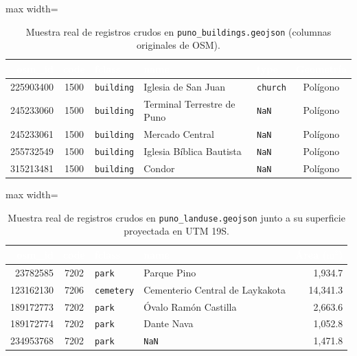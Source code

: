 \documentclass[11pt,a4paper]{article}
\begin{document}
\begin{table}[H]
    \centering
    \caption{Muestra real de registros crudos en \texttt{puno\_buildings.geojson} (columnas originales de OSM).}
    \label{tab:crudo_buildings}
    \footnotesize
    \begin{adjustbox}{max width=\textwidth}
    \begin{tabular}{rclllc}
        \toprule
        \rowcolor{verdeHeader}
        \textcolor{white}{\textbf{osm\_id}} & \textcolor{white}{\textbf{code}} & \textcolor{white}{\textbf{fclass}} & \textcolor{white}{\textbf{name}} & \textcolor{white}{\textbf{type}} & \textcolor{white}{\textbf{Geometría}} \\
        \midrule
        225903400 & 1500 & \texttt{building} & Iglesia de San Juan & \texttt{church} & Polígono \\
        \rowcolor{verdeSuave!50}
        245233060 & 1500 & \texttt{building} & Terminal Terrestre de Puno & \texttt{NaN} & Polígono \\
        245233061 & 1500 & \texttt{building} & Mercado Central & \texttt{NaN} & Polígono \\
        \rowcolor{verdeSuave!50}
        255732549 & 1500 & \texttt{building} & Iglesia Bíblica Bautista & \texttt{NaN} & Polígono \\
        315213481 & 1500 & \texttt{building} & Condor & \texttt{NaN} & Polígono \\
        \bottomrule
    \end{tabular}
    \end{adjustbox}
\end{table}

\begin{table}[H]
    \centering
    \caption{Muestra real de registros crudos en \texttt{puno\_landuse.geojson} junto a su superficie proyectada en UTM 19S.}
    \label{tab:crudo_landuse}
    \footnotesize
    \begin{adjustbox}{max width=\textwidth}
    \begin{tabular}{rcllr}
        \toprule
        \rowcolor{verdeHeader}
        \textcolor{white}{\textbf{osm\_id}} & \textcolor{white}{\textbf{code}} & \textcolor{white}{\textbf{fclass}} & \textcolor{white}{\textbf{name}} & \textcolor{white}{\textbf{Área ($\text{m}^2$)}} \\
        \midrule
        23782585 & 7202 & \texttt{park} & Parque Pino & 1{,}934.7 \\
        \rowcolor{verdeSuave!50}
        123162130 & 7206 & \texttt{cemetery} & Cementerio Central de Laykakota & 14{,}341.3 \\
        189172773 & 7202 & \texttt{park} & Óvalo Ramón Castilla & 2{,}663.6 \\
        \rowcolor{verdeSuave!50}
        189172774 & 7202 & \texttt{park} & Dante Nava & 1{,}052.8 \\
        234953768 & 7202 & \texttt{park} & \texttt{NaN} & 1{,}471.8 \\
        \bottomrule
    \end{tabular}
    \end{adjustbox}
\end{table}
\end{document}
